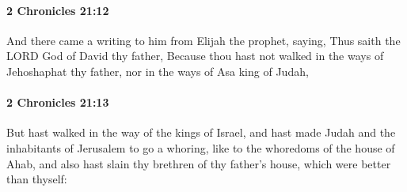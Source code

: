 		\paragraph{2 Chronicles 21:12} %
			\label{2CHRONICLES-21-12}

			And there came a writing to him from Elijah the prophet, saying, Thus saith the LORD God of David thy father, Because thou hast not walked in the ways of Jehoshaphat thy father, nor in the ways of Asa king of Judah,


		\paragraph{2 Chronicles 21:13} %
			\label{2CHRONICLES-21-13}

			But hast walked in the way of the kings of Israel, and hast made Judah and the inhabitants of Jerusalem to go a whoring, like to the whoredoms of the house of Ahab, and also hast slain thy brethren of thy father's house, which were better than thyself:

